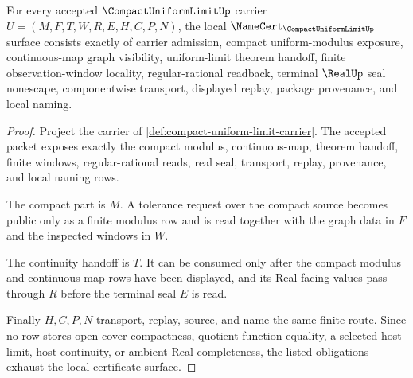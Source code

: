 \begin{theorem}
\label{thm:compact-uniform-limit-namecert-obligations}
For every accepted $\CompactUniformLimitUp$ carrier $U=(M,F,T,W,R,E,H,C,P,N)$, the local $\NameCert_{\CompactUniformLimitUp}$ surface consists exactly of carrier admission, compact uniform-modulus exposure, continuous-map graph visibility, uniform-limit theorem handoff, finite observation-window locality, regular-rational readback, terminal $\RealUp$ seal nonescape, componentwise transport, displayed replay, package provenance, and local naming.
\end{theorem}
\begin{proof}
Project the carrier of \autoref{def:compact-uniform-limit-carrier}. The accepted packet exposes exactly the compact modulus, continuous-map, theorem handoff, finite windows, regular-rational reads, real seal, transport, replay, provenance, and local naming rows.

The compact part is $M$. A tolerance request over the compact source becomes public only as a finite modulus row and is read together with the graph data in $F$ and the inspected windows in $W$.

The continuity handoff is $T$. It can be consumed only after the compact modulus and continuous-map rows have been displayed, and its Real-facing values pass through $R$ before the terminal seal $E$ is read.

Finally $H,C,P,N$ transport, replay, source, and name the same finite route. Since no row stores open-cover compactness, quotient function equality, a selected host limit, host continuity, or ambient Real completeness, the listed obligations exhaust the local certificate surface.
\end{proof}

